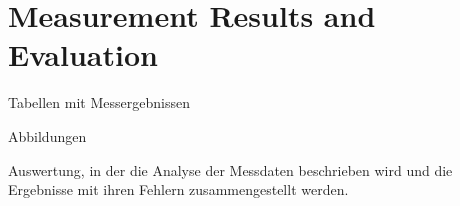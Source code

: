 \section{Measurement Results and Evaluation}
Tabellen mit Messergebnissen

Abbildungen

Auswertung, in der die Analyse der Messdaten beschrieben wird und die Ergebnisse mit ihren Fehlern zusammengestellt werden.